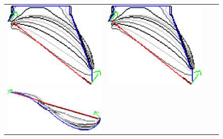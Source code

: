 \begin{figure}
\begin{tabular}{cccc}
\includegraphics[scale=0.25]{figures/chapter9/constrained-elastica/graphflow/curve-2/len_pen-0.002/radius-15/N-1/h1.0/summary.pdf} &
\includegraphics[scale=0.25]{figures/chapter9/constrained-elastica/graphflow/curve-2/len_pen-0.0002/radius-15/N-1/h1.0/summary.pdf}\\
\includegraphics[scale=0.2]{figures/chapter9/constrained-elastica/localsearch/curve-3/len_pen-0.002/radius-15/nc-4/h1.0/summary.pdf} &

\end{tabular}
\end{figure}
